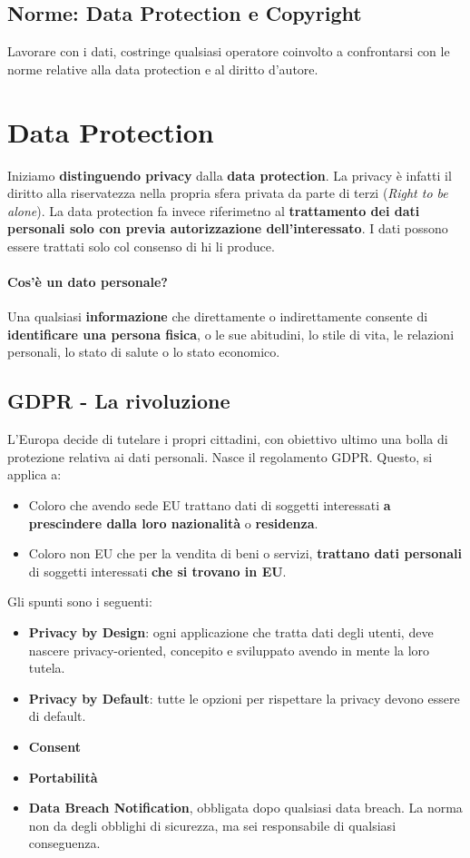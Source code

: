 \subsection{Norme: Data Protection e Copyright}
Lavorare con i dati, costringe qualsiasi operatore coinvolto a confrontarsi con le norme relative alla data protection e al diritto d'autore.

\section{Data Protection}
Iniziamo \textbf{distinguendo privacy} dalla \textbf{data protection}. La privacy è infatti il diritto alla riservatezza nella propria sfera privata da parte di terzi (\textit{Right to be alone}). La data protection fa invece riferimetno al \textbf{trattamento dei dati personali solo con previa autorizzazione dell'interessato}. I dati possono essere trattati solo col consenso di hi li produce.

\paragraph{Cos'è un dato personale?} Una qualsiasi \textbf{informazione} che direttamente o indirettamente consente di \textbf{identificare una persona fisica}, o le sue abitudini, lo stile di vita, le relazioni personali, lo stato di salute o lo stato economico.

\subsection{GDPR - La rivoluzione}
L'Europa decide di tutelare i propri cittadini, con obiettivo ultimo una bolla di protezione relativa ai dati personali. Nasce il regolamento GDPR. Questo, si applica a:
\begin{itemize}
	\item Coloro che avendo sede EU trattano dati di soggetti interessati \textbf{a prescindere dalla loro nazionalità} o \textbf{residenza}.
	\item Coloro non EU che per la vendita di beni o servizi, \textbf{trattano dati personali} di soggetti interessati \textbf{che si trovano in EU}.
\end{itemize}

Gli spunti sono i seguenti:
\begin{itemize}
	\item\textbf{Privacy by Design}: ogni applicazione che tratta dati degli utenti, deve nascere privacy-oriented, concepito e sviluppato avendo in mente la loro tutela.
	\item\textbf{Privacy by Default}: tutte le opzioni per rispettare la privacy devono essere di default.
	\item\textbf{Consent}
	\item\textbf{Portabilità}
	\item\textbf{Data Breach Notification}, obbligata dopo qualsiasi data breach. La norma non da degli obblighi di sicurezza, ma sei responsabile di qualsiasi conseguenza.	
\end{itemize}

